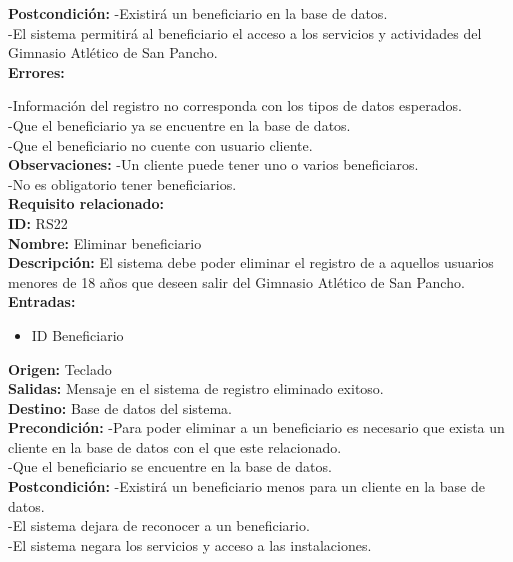 \textbf{Postcondición: }
-Existirá un beneficiario  en la base de datos.\\
-El sistema permitirá al beneficiario el acceso a los servicios y actividades del Gimnasio Atlético de San Pancho.\\


\textbf{Errores: }

-Información del registro no corresponda con los tipos de datos esperados.\\
-Que el beneficiario ya se encuentre en la base de datos.\\
-Que el beneficiario no cuente con usuario cliente.\\

\textbf{Observaciones: }
-Un cliente puede tener uno o varios beneficiaros.\\
-No es obligatorio tener beneficiarios.\\

\textbf{Requisito relacionado:} \\


\textbf{ID:} RS22\\
\textbf{Nombre:} Eliminar beneficiario\\
\textbf{Descripción:} El sistema debe poder eliminar el registro de a aquellos usuarios menores de 18 años que deseen salir  del Gimnasio Atlético de San Pancho.\\

\textbf{Entradas: }
        \begin{itemize}
         \item ID Beneficiario
\end{itemize}
\textbf{Origen:} Teclado\\
\textbf{Salidas:} Mensaje en el sistema de registro eliminado exitoso.\\
\textbf{Destino:} Base de datos del sistema.\\
\textbf{Precondición: }
-Para poder eliminar a un beneficiario es necesario que exista un cliente en la base de datos con el que este relacionado.\\
-Que el beneficiario  se encuentre en la base de datos.\\


\textbf{Postcondición: }
-Existirá un beneficiario  menos para un cliente en la base de datos.\\
-El sistema dejara de reconocer a un beneficiario.\\
-El sistema negara los servicios y acceso a las instalaciones.\\

